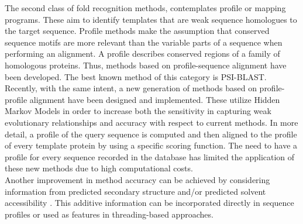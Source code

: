 The second class of fold recognition methods, contemplates profile or mapping programs. These aim to identify templates that are weak sequence homologues to the target sequence. Profile methods make the assumption that conserved sequence motifs are more relevant than the variable parts of a sequence when performing an alignment. A profile describes conserved regions of a family of homologous proteins. Thus, methods based on profile-sequence alignment have been developed. The best known method of this category is PSI-BLAST. Recently, with the same intent, a new generation of methods based on profile-profile alignment \cite{Sadreyev2003aa} have been designed and implemented. These utilize Hidden Markov Models in order to increase both the sensitivity in capturing weak evolutionary relationships and accuracy with respect to current methods. In more detail, a profile of the query sequence is computed and then aligned to the profile of every template protein by using a specific scoring function. The need to have a profile for every sequence recorded in the database has limited the application of these new methods due to high computational costs. \\
Another improvement in method accuracy can be achieved by considering information from predicted secondary structure and/or predicted solvent accessibility \cite{Jones1999aa, Pettitt2005aa}. This additive information can be incorporated directly in sequence profiles or used as features in threading-based approaches.


